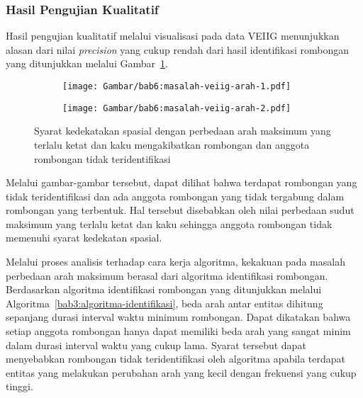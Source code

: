 \subsubsection{Hasil Pengujian Kualitatif}
\label{subsubsec:veiig-qualitative}

Hasil pengujian kualitatif melalui visualisasi pada data VEIIG menunjukkan alasan dari nilai \textit{precision} yang cukup rendah dari hasil identifikasi rombongan yang ditunjukkan melalui Gambar~\ref{bab6:masalah-veiig-arah}. 

\begin{figure}[b!]
    \centering
    \captionsetup{width=.65\textwidth}
    \begin{subfigure}[b]{0.225\textwidth}
        \centering
        \texttt{[image: Gambar/bab6:masalah-veiig-arah-1.pdf]}
    \end{subfigure}
    \begin{subfigure}[b]{0.225\textwidth}
        \centering
        \texttt{[image: Gambar/bab6:masalah-veiig-arah-2.pdf]}
    \end{subfigure}
    \caption[Masalah perbedaan arah maksimum pada data VEIIG]{Syarat kedekatakan spasial dengan perbedaan arah maksimum yang terlalu ketat dan kaku mengakibatkan rombongan dan anggota rombongan tidak teridentifikasi}
    \label{bab6:masalah-veiig-arah}
\end{figure}

Melalui gambar-gambar tersebut, dapat dilihat bahwa terdapat rombongan yang tidak teridentifikasi dan ada anggota rombongan yang tidak tergabung dalam rombongan yang terbentuk. Hal tersebut disebabkan oleh nilai perbedaan sudut maksimum yang terlalu ketat dan kaku sehingga anggota rombongan tidak memenuhi syarat kedekatan spasial.

Melalui proses analisis terhadap cara kerja algoritma, kekakuan pada masalah perbedaan arah maksimum berasal dari algoritma identifikasi rombongan. Berdasarkan algoritma identifikasi rombongan yang ditunjukkan melalui Algoritma~\ref{bab3:algoritma-identifikasi}, beda arah antar entitas dihitung sepanjang durasi interval waktu minimum rombongan. Dapat dikatakan bahwa setiap anggota rombongan hanya dapat memiliki beda arah yang sangat minim dalam durasi interval waktu yang cukup lama. Syarat tersebut dapat menyebabkan rombongan tidak teridentifikasi oleh algoritma apabila terdapat entitas yang melakukan perubahan arah yang kecil dengan frekuensi yang cukup tinggi.

